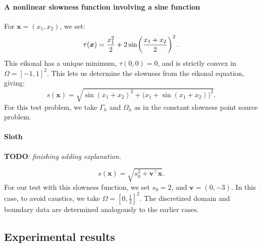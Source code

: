 \documentclass{siamart190516}
\newcommand{\m}[1]{\boldsymbol{#1}}
\begin{document}
\paragraph{A nonlinear slowness function involving a sine function}
For $\m{x} = (x_1, x_2)$, we set:
\begin{equation}
  \tau(\m{x}) = \frac{x_1^2}{2} + 2 \sin\hspace{-0.1em}\left(\frac{x_1 + x_2}{2}\right)^2.
\end{equation}
This eikonal has a unique minimum, $\tau(0, 0) = 0$, and is strictly
convex in $\Omega = [-1, 1]^2$. This lets us determine the slowness
from the eikonal equation, giving:
\begin{equation}
  s(\m{x}) = \sqrt{\sin(x_1 + x_2)^2 + \big(x_1 + \sin(x_1 + x_2)\big)^2}.
\end{equation}
For this test problem, we take $\Gamma_h$ and $\Omega_h$ as in the
constant slowness point source problem.

\paragraph{Sloth} \textbf{TODO}: \emph{finishing adding explanation.}

\begin{equation}
  s(\m{x}) = \sqrt{s_0^2 + \m{v}^\top \m{x}}.
\end{equation}
For our test with this slowness function, we set $s_0 = 2$, and
$\m{v} = (0, -3)$. In this case, to avoid caustics, we take
$\Omega = [0, \tfrac{1}{2}]^2$. The discretized domain and boundary
data are determined analogously to the earlier cases.

\subsection{Experimental results}
\end{document}
